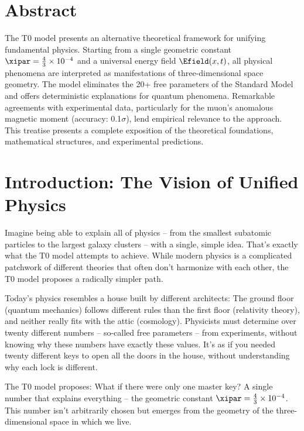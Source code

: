 \section*{Abstract}
		\noindent The T0 model presents an alternative theoretical framework for unifying fundamental physics. Starting from a single geometric constant $\xipar = \frac{4}{3} \times 10^{-4}$ and a universal energy field $\Efield(x,t)$, all physical phenomena are interpreted as manifestations of three-dimensional space geometry. The model eliminates the 20+ free parameters of the Standard Model and offers deterministic explanations for quantum phenomena. Remarkable agreements with experimental data, particularly for the muon's anomalous magnetic moment (accuracy: 0.1$\sigma$), lend empirical relevance to the approach. This treatise presents a complete exposition of the theoretical foundations, mathematical structures, and experimental predictions.

	

	\section{Introduction: The Vision of Unified Physics}
	
	Imagine being able to explain all of physics -- from the smallest subatomic particles to the largest galaxy clusters -- with a single, simple idea. That's exactly what the T0 model attempts to achieve. While modern physics is a complicated patchwork of different theories that often don't harmonize with each other, the T0 model proposes a radically simpler path.
	
	Today's physics resembles a house built by different architects: The ground floor (quantum mechanics) follows different rules than the first floor (relativity theory), and neither really fits with the attic (cosmology). Physicists must determine over twenty different numbers -- so-called free parameters -- from experiments, without knowing why these numbers have exactly these values. It's as if you needed twenty different keys to open all the doors in the house, without understanding why each lock is different.
	
	\begin{revolutionary}
		The T0 model proposes: What if there were only one master key? A single number that explains everything -- the geometric constant $\xipar = \frac{4}{3} \times 10^{-4}$. This number isn't arbitrarily chosen but emerges from the geometry of the three-dimensional space in which we live.
	\end{revolutionary}
	
